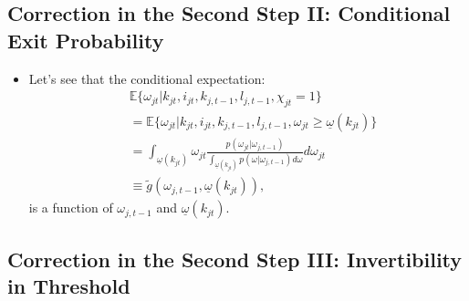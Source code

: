 \documentclass[
]{book}
\providecommand{\tightlist}{%
  \setlength{\itemsep}{0pt}\setlength{\parskip}{0pt}}
\begin{document}
\hypertarget{correction-in-the-second-step-ii-conditional-exit-probability}{%
\subsection{Correction in the Second Step II: Conditional Exit Probability}\label{correction-in-the-second-step-ii-conditional-exit-probability}}

\begin{itemize}
\tightlist
\item
  Let's see that the conditional expectation:
  \begin{equation}
  \begin{split}
  &\mathbb{E}\{\omega_{jt}| k_{jt}, i_{jt}, k_{j, t - 1}, l_{j, t - 1}, \chi_{jt} = 1 \}\\
  &=\mathbb{E}\{\omega_{jt}| k_{jt}, i_{jt}, k_{j, t - 1}, l_{j, t - 1}, \omega_{jt} \ge \underline{\omega}(k_{jt}) \}\\
  &=\int_{\underline{\omega}(k_{jt})} \omega_{jt} \frac{p(\omega_{jt}|\omega_{j, t - 1})}{\int_{\underline{\omega}(k_{jt})} p(\omega|\omega_{j, t - 1}) d\omega } d \omega_{jt}\\
  &\equiv \tilde{g}(\omega_{j, t - 1}, \underline{\omega}(k_{jt})),
  \end{split}
  \end{equation}
  is a function of \(\omega_{j, t - 1}\) and \(\underline{\omega}(k_{jt})\).
\end{itemize}

\hypertarget{correction-in-the-second-step-iii-invertibility-in-threshold}{%
\subsection{Correction in the Second Step III: Invertibility in Threshold}\label{correction-in-the-second-step-iii-invertibility-in-threshold}}
\end{document}
